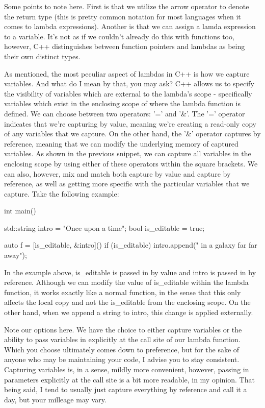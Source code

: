 \documentclass{article}
\begin{document}
Some points to note here. First is that we utilize the arrow operator to denote the return type (this is
pretty common notation for most languages when it comes to lambda expressions). Another is that we can assign
a lamda expression to a variable. It's not as if we couldn't already do this with functions too, however,
C++ distinguishes between function pointers and lambdas as being their own distinct types.

As mentioned, the most peculiar aspect of lambdas in C++ is how we capture variables. And what do I mean by
that, you may ask? C++ allows us to specify the visibility of variables which are external to the lambda's
scope - specifically variables which exist in the enclosing scope of where the lambda function is defined.
We can choose between two operators: '=' and '\&'. The '=' operator indicates that we're capturing by value,
meaning we're creating a read-only copy of any variables that we capture. On the other hand, the '\&' operator
captures by reference, meaning that we can modify the underlying memory of captured variables. As shown in
the previous snippet, we can capture all variables in the enclosing scope by using either of these operators
within the square brackets. We can also, however, mix and match both capture by value and capture by reference,
as well as getting more specific with the particular variables that we capture. Take the following example:

\begin{cpplst}

int main()
{
    std::string intro = "Once upon a time";
    bool is_editable = true;

    auto f = [is_editable, &intro]() {
        if (is_editable)
        {
            intro.append(" in a galaxy far far away");
        }
    }
}

\end{cpplst}

In the example above, is\_editable is passed in by value and intro is passed in by reference. Although we can
modify the value of is\_editable within the lambda function, it works exactly like a normal function, in the
sense that this only affects the local copy and not the is\_editable from the enclosing scope. On the other
hand, when we append a string to intro, this change is applied externally.

Note our options here. We have the choice to either capture variables or the ability to pass variables in
explicitly at the call site of our lambda function. Which you choose ultimately comes down to preference,
but for the sake of anyone who may be maintaining your code, I advise you to stay consistent. Capturing
variables is, in a sense, mildly more convenient, however, passing in parameters explicitly at the call site
is a bit more readable, in my opinion. That being said, I tend to usually just capture everything by
reference and call it a day, but your milleage may vary.
\end{document}
